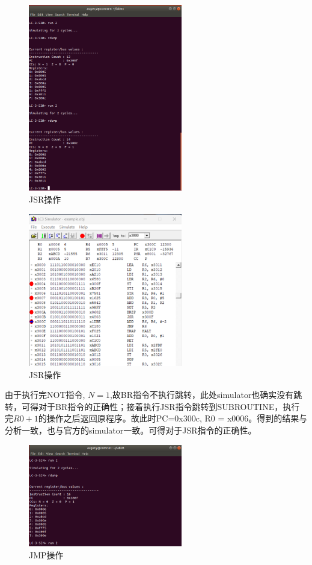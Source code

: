 \documentclass[runningheads]{llncs}
\begin{document}
\begin{figure}[H]
    \centering
    \includegraphics[width=0.6\textwidth]{8.png}
    \caption{JSR操作}
    \label{fig:3-8}
\end{figure}
\vspace{-1cm}
\begin{figure}[H]
    \centering
    \includegraphics[width=0.6\textwidth]{9.png}
    \caption{JSR操作}
    \label{fig:3-9}
\end{figure}
由于执行完NOT指令, $N=1$,故BR指令不执行跳转，此处simulator也确实没有跳转，可得对于BR指令的正确性；接着执行JSR指令跳转到SUBROUTINE，执行完$R0 + 1$的操作之后返回原程序。故此时PC=0x300c, R0 = x0006。得到的结果与分析一致，也与官方的simulator一致。可得对于JSR指令的正确性。
\vspace{-0.6cm}
\begin{figure}[H]
    \centering
    \includegraphics[width=0.6\textwidth]{10.png}
    \caption{JMP操作}
    \label{fig:3-10}
\end{figure}
\end{document}
